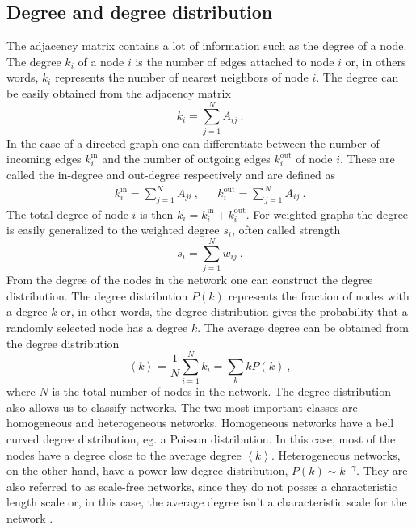 \documentclass[11 pt , letterpaper , twoside , openright]{book}
\begin{document}
\subsection{Degree and degree distribution}

The adjacency matrix contains a lot of information such as the degree of a node. The degree $k_i$ of a node $i$ is the number of edges attached to node $i$ or, in others words, $k_i$ represents the number of nearest neighbors of node $i$. The degree can be easily obtained from the adjacency matrix \cite{Mata2020}
\begin{equation}
	k_i = \sum_{j=1}^N A_{ij}\ .
\end{equation}
In the case of a directed graph one can differentiate between the number of incoming edges $k_i^{\textrm{in}}$ and the number of outgoing edges $k_i^{\textrm{out}}$ of node $i$. These are called the in-degree and out-degree respectively and are defined as \cite{Mata2020}
\begin{align}
	k_i^{\text{in}} = \sum_{j=1}^N A_{ji} \ , && k_i^{\text{out}} = \sum_{j=1}^N A_{ij} \ .
\end{align}
The total degree of node $i$ is then $k_i = k_i^{\text{in}} + k_i^{\text{out}}$. For weighted graphs the degree is easily generalized to the weighted degree $s_i$, often called strength \cite{Ioannis2007}
\begin{equation}
	s_i = \sum_{j=1}^N w_{ij} \ .
\end{equation}
From the degree of the nodes in the network one can construct the degree distribution. The degree distribution $P(k)$ represents the fraction of nodes with a degree $k$ or, in other words, the degree distribution gives the probability that a randomly selected node has a degree $k$. The average degree can be obtained from the degree distribution \cite{Mata2020}
\begin{equation}
	\left<k\right> = \frac{1}{N} \sum_{i=1}^N k_i = \sum_k k P(k) \ ,
\end{equation}
where $N$ is the total number of nodes in the network. The degree distribution also allows us to classify networks. The two most important classes are homogeneous and heterogeneous networks. Homogeneous networks have a bell curved degree distribution, eg. a Poisson distribution. In this case, most of the nodes have a degree close to the average degree $\left<k\right>$. Heterogeneous networks, on the other hand, have a power-law degree distribution, $P(k) \sim k^{-\gamma}$. %
They are also referred to as scale-free networks, since they do not posses a characteristic length scale or, in this case, the average degree isn't a characteristic scale for the network \cite{Mata2020}. %
\end{document}
